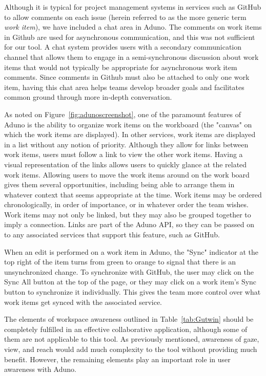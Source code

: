 \documentclass[conference]{IEEEtran}
\begin{document}
Although it is typical for project management systems in services such as GitHub to allow comments on each issue (herein referred to as the more generic term \textit{work item}), we have included a chat area in Aduno. The comments on work items in Github are used for asynchronous communication, and this was not sufficient for our tool. A chat system provides users with a secondary communication channel that allows them to engage in a semi-synchronous discussion about work items that would not typically be appropriate for asynchronous work item comments. Since comments in Github must also be attached to only one work item, having this chat area helps teams develop broader goals and facilitates common ground through more in-depth conversation.

As noted on Figure~\ref{fig:adunoscreenshot}, one of the paramount features of Aduno is the ability to organize work items on the workboard (the "canvas" on which the work items are displayed). In other services, work items are displayed in a list without any notion of priority. Although they allow for links between work items, users must follow a link to view the other work items. Having a visual representation of the links allows users to quickly glance at the related work items. Allowing users to move the work items around on the work board gives them several opportunities, including being able to arrange them in whatever context that seems appropriate at the time. Work items may be ordered chronologically, in order of importance, or in whatever order the team wishes. Work items may not only be linked, but they may also be grouped together to imply a connection. Links are part of the Aduno API, so they can be passed on to any associated services that support this feature, such as GitHub.

When an edit is performed on a work item in Aduno, the "Sync" indicator at the top right of the item turns from green to orange to signal that there is an unsynchronized change. To synchronize with GitHub, the user may click on the Sync All button at the top of the page, or they may click on a work item's Sync button to synchronize it individually. This gives the team more control over what work items get synced with the associated service.

The elements of workspace awareness outlined in Table~\ref{tab:Gutwin} should be completely fulfilled in an effective collaborative application, although some of them are not applicable to this tool. As previously mentioned, awareness of gaze, view, and reach would add much complexity to the tool without providing much benefit. However, the remaining elements play an important role in user awareness with Aduno.
  
\end{document}
